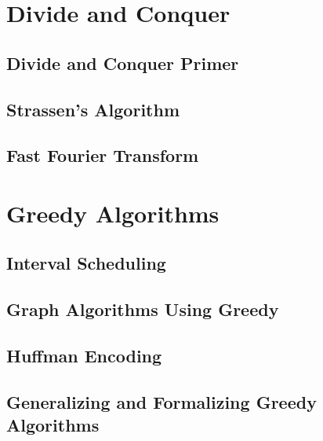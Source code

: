 \documentclass[11pt,fleqn,dvipsnames]{book} %
\begin{document}
\pagestyle{fancy} %

\setlength{\parskip}{1em}

\part{Divide and Conquer}

\chapter{Divide and Conquer Primer}


\chapter{Strassen's Algorithm}


\chapter{Fast Fourier Transform}


\part{Greedy Algorithms}

\chapter{Interval Scheduling}


\chapter{Graph Algorithms Using Greedy}


\chapter{Huffman Encoding}

\chapter{Generalizing and Formalizing Greedy Algorithms}

\end{document}
